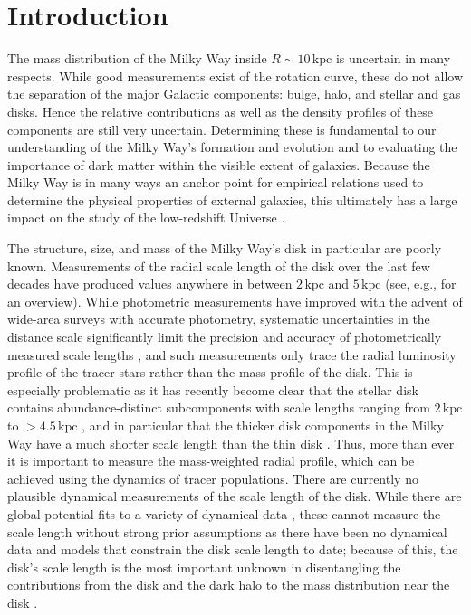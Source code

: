 \documentclass{emulateapj}
\newcommand{\eg}{e.g.}
\newcommand{\kpc}{\ensuremath{\,\mathrm{kpc}}}
\begin{document}


\section{Introduction}

The mass distribution of the Milky Way inside $R \sim 10\kpc$ is
uncertain in many respects. While good measurements exist of the
rotation curve, these do not allow the separation of the major
Galactic components: bulge, halo, and stellar and gas disks. Hence the
relative contributions as well as the density profiles of these
components are still very uncertain. Determining these is fundamental
to our understanding of the Milky Way's formation and evolution and to
evaluating the importance of dark matter within the visible extent of
galaxies. Because the Milky Way is in many ways an anchor point for
empirical relations used to determine the physical properties of
external galaxies, this ultimately has a large impact on the study of
the low-redshift Universe \citep{Rix13a}.

The structure, size, and mass of the Milky Way's disk in particular
are poorly known. Measurements of the radial scale length of the disk
over the last few decades have produced values anywhere in between
$2\kpc$ and $5\kpc$ (see, \eg, \citealt{Sackett97a} for an
overview). While photometric measurements have improved with the
advent of wide-area surveys with accurate photometry, systematic
uncertainties in the distance scale significantly limit the precision
and accuracy of photometrically measured scale lengths
\citep[\eg,][]{Juric08a}, and such measurements only trace the radial
luminosity profile of the tracer stars rather than the mass profile of
the disk. This is especially problematic as it has recently become
clear that the stellar disk contains abundance-distinct subcomponents
with scale lengths ranging from $2\kpc$ to $>4.5\kpc$
\citep{BovyMAPstructure}, and in particular that the thicker disk
components in the Milky Way have a much shorter scale length than the
thin disk \citep{Bensby11a,BovyMAPstructure,Cheng12a}. Thus, more than
ever it is important to measure the mass-weighted radial profile,
which can be achieved using the dynamics of tracer populations. There
are currently no plausible dynamical measurements of the scale length
of the disk. While there are global potential fits to a variety of
dynamical data \citep[\eg,][]{McMillan11a}, these cannot measure the
scale length without strong prior assumptions as there have been no
dynamical data and models that constrain the disk scale length to
date; because of this, the disk's scale length is the most important
unknown in disentangling the contributions from the disk and the dark
halo to the mass distribution near the disk \citep{Dehnen98a}.
\end{document}
